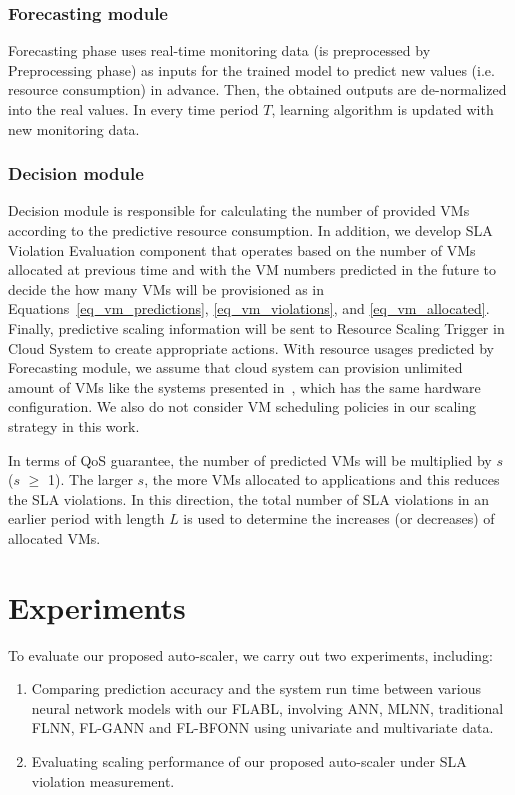\documentclass[runningheads]{llncs}
\begin{document}
\subsubsection{Forecasting module}
\label{forecasting_module}
Forecasting phase uses real-time monitoring data (is preprocessed by Preprocessing phase) as inputs for the trained model to predict new values (i.e. resource consumption) in advance. Then, the obtained outputs are de-normalized into the real values. In every time period $T$, learning algorithm is updated with new monitoring data.


\subsubsection{Decision module}
\label{decision_module}
Decision module is responsible for calculating the number of provided VMs according to the predictive resource consumption. In addition, we develop SLA Violation Evaluation component that operates based on the number of VMs allocated at previous time and with the VM numbers predicted in the future to decide the how many VMs will be provisioned as in Equations~\ref{eq_vm_predictions}, \ref{eq_vm_violations}, and \ref{eq_vm_allocated}. 
Finally, predictive scaling information will be sent to Resource Scaling Trigger in Cloud System to create appropriate actions.
With resource usages predicted by Forecasting module, we assume that cloud system can provision unlimited amount of VMs like the systems presented in~\cite{ref_nguyen}, which has the same hardware configuration. We also do not consider VM scheduling policies in our scaling strategy in this work. 


In terms of QoS guarantee, the number of predicted VMs will be multiplied by $s$ ($s$ $\ge$ 1). The larger $s$, the more VMs allocated to applications and this reduces the SLA violations. In this direction, the total number of SLA violations in an earlier period with length $L$ is used to determine the increases (or decreases) of allocated VMs. 



\section{Experiments}
\label{experiments}
To evaluate our proposed auto-scaler, we carry out two experiments, including:

\begin{enumerate}
	\item Comparing prediction accuracy and the system run time between various neural network models with our FLABL, involving ANN, MLNN, traditional FLNN, FL-GANN and FL-BFONN using univariate and multivariate data. 
	\item Evaluating scaling performance of our proposed auto-scaler under SLA violation measurement.
\end{enumerate}
\end{document}
